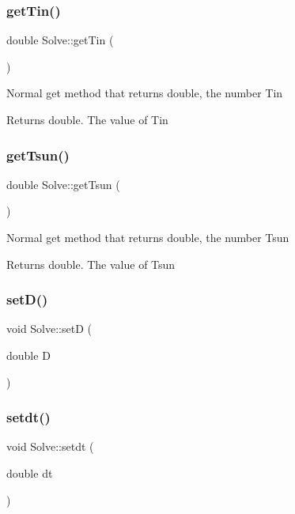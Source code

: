 \subsubsection{\texorpdfstring{get\+Tin()}{getTin()}}
{\footnotesize\ttfamily double Solve\+::get\+Tin (\begin{DoxyParamCaption}{ }\end{DoxyParamCaption})}

Normal get method that returns double, the number Tin \begin{DoxyReturn}{Returns}
double. The value of Tin 
\end{DoxyReturn}
\mbox{\label{class_solve_afad3694fc830b80135a316eea2c0c279}} 
\subsubsection{\texorpdfstring{get\+Tsun()}{getTsun()}}
{\footnotesize\ttfamily double Solve\+::get\+Tsun (\begin{DoxyParamCaption}{ }\end{DoxyParamCaption})}

Normal get method that returns double, the number Tsun \begin{DoxyReturn}{Returns}
double. The value of Tsun 
\end{DoxyReturn}
\mbox{\label{class_solve_ab313553673e1e419bcc150be13d3d58b}} 
\subsubsection{\texorpdfstring{set\+D()}{setD()}}
{\footnotesize\ttfamily void Solve\+::setD (\begin{DoxyParamCaption}\item[{double}]{D }\end{DoxyParamCaption})}

\mbox{\label{class_solve_af05556226469b3b7d4773b61342fbf73}} 
\subsubsection{\texorpdfstring{setdt()}{setdt()}}
{\footnotesize\ttfamily void Solve\+::setdt (\begin{DoxyParamCaption}\item[{double}]{dt }\end{DoxyParamCaption})}

